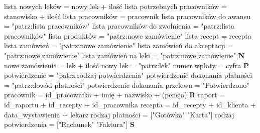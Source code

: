 \documentclass[a4paper, 11pt]{article}
\begin{document}
	lista nowych leków = nowy lek + ilość \newline
	lista potrzebnych pracowników = stanowisko + ilość \newline
	lista pracowników = {pracownik} \newline
	lista pracowników do awansu = "patrz:lista pracowników" \newline
	lista pracowników do zwolnienia = "patrz:lista pracowników" \newline
	lista produktów = "patrz:nowe zamówienie" \newline
	lista recept = {recepta} \newline
	lista zamówień = "patrz:nowe zamówienie" \newline
	lista zamówień do akceptacji = "patrz:nowe zamówienie" \newline
	lista zamówień na leki = "patrz:nowe zamówienie" \newline \newline
	\textbf{N} \newline\newline
	\noindent
	nowe zamówienie = lek + ilość \newline
	nowy lek = "patrz:lek" \newline
	numer wpłaty = {cyfra} \newline \newline
	\textbf{P} \newline \newline
	\noindent
	potwierdzenie = "patrz:rodzaj potwierdzenia" \newline
	potwierdzenie dokonania płatności = "patrz:dowód płatności" \newline
	potwierdzenie dokonania przelewu = "Potwierdzono" \newline
	pracownik = \at id\_pracownika + imię + nazwisko + (pensja) \newline \newline
	\textbf{R} \newline \newline
	\noindent	
	raport = \at id\_raportu + id\_recepty + id\_pracownika \newline
	recepta = \at id\_recepty + id\_klienta + data\_wystawienia + lekarz \newline
	rodzaj płatności = ["Gotówka" \textpipe "Karta"] \newline
	rodzaj potwierdzenia = ["Rachunek" \textpipe "Faktura"] \newline \newline
	\textbf{S} \newline \newline
\end{document}
